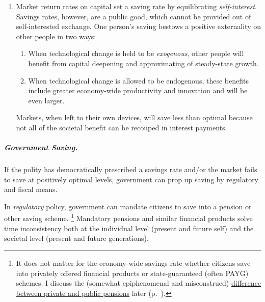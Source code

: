\begin{enumerate}
	\item Market return rates on capital set a saving rate by equilibrating \emph{self-interest}.
	Savings rates, however, are a public good, which cannot be provided out of self-interested exchange.
	One person's saving  bestows a positive externality on other people in two ways:

	\begin{enumerate}
		\item When technological change is held to be \emph{exogenous}, other people will benefit from capital deepening and approximating of steady-state growth.
		\item When technological change is allowed to be endogenous, these benefits include greater economy-wide productivity and innovation and will be even larger.
	\end{enumerate}

	Markets, when left to their own devices, will save less than optimal because not all of the societal benefit can be recouped in interest payments.
\end{enumerate}

\subparagraph{Government Saving.}
	\label{sec:government-saves}
If the polity has democratically prescribed a savings rate and/or the market fails to save at positively optimal levels, government can prop up saving by regulatory and fiscal means.

In \emph{regulatory} policy, government can mandate citizens to save into a pension or other saving scheme.
\footnote{
	It does not matter for the economy-wide savings rate whether citizens save into privately offered financial products or state-guaranteed (often \gls{PAYG}) schemes.
	I discuss the (somewhat epiphenomenal and misconstrued) \hyperref[sec:pensions]{difference between private and public pensions} later (p.~\pageref{sec:pensions}).
}
Mandatory pensions and similar financial products solve time inconsistency both at the individual level (present and future self) and the societal level (present and future generations).

